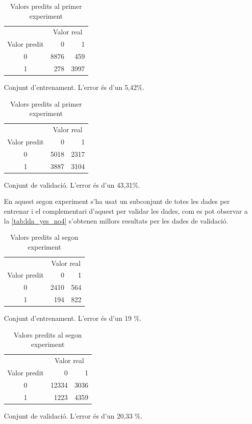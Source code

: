 \documentclass[a4paper]{article}
\begin{document}
\begin{table}[H]
	\def\arraystretch{1.5}
	\begin{subtable}[t]{0.49\textwidth}
		\centering
		\begin{tabular}{|c|rr|}
			\hline
			& \multicolumn{2}{c|}{Valor real} \\
			Valor predit & 0 & 1 \\
			\hline
			0 & 8876 & 459 \\
			1 & 278 & 3997 \\
			\hline
		\end{tabular}
		\caption{Conjunt d'entrenament. L'error és d'un 5,42\%.}
		\label{tab:lda_yes_no1}
	\end{subtable}
	\hfill
	\begin{subtable}[t]{0.49\textwidth}
		\centering
		\begin{tabular}{|c|rr|}
			\hline
			& \multicolumn{2}{c|}{Valor real} \\
			Valor predit & 0 & 1 \\
			\hline
			0 & 5018 & 2317 \\
			1 & 3887 & 3104 \\
			\hline
		\end{tabular}
		\caption{Conjunt de validació. L'error és d'un 43,31\%.}
		\label{tab:lda_yes_no2}
	\end{subtable}
	\caption{Valors predits al primer experiment}
\end{table}

En aquest segon experiment s'ha usat un subconjunt de totes les dades per entrenar i el complementari d'aquest per validar les dades, com es pot observar a la \autoref{tab:lda_yes_no4} s'obtenen millors resultats per les dades de validació.

\begin{table}[H]
	\def\arraystretch{1.5}
	\begin{subtable}[t]{0.49\textwidth}
		\centering
		\begin{tabular}{|c|rr|}
			\hline
			& \multicolumn{2}{c|}{Valor real} \\
			Valor predit & 0 & 1 \\
			\hline
			0 & 2410 & 564 \\
			1 &  194 & 822 \\
			\hline
		\end{tabular}
		\caption{Conjunt d'entrenament. L'error és d'un 19 \%.}
		\label{tab:lda_yes_no3}
	\end{subtable}
	\hfill
	\begin{subtable}[t]{0.49\textwidth}
		\centering
		\begin{tabular}{|c|rr|}
			\hline
			& \multicolumn{2}{c|}{Valor real} \\
			Valor predit & 0 & 1 \\
			\hline
			0 & 12334 & 3036 \\
			1 &  1223 & 4359 \\
			\hline
		\end{tabular}
		\caption{Conjunt de validació. L'error és d'un 20,33 \%.}
		\label{tab:lda_yes_no4}
	\end{subtable}
	\caption{Valors predits al segon experiment}
\end{table}
\end{document}
